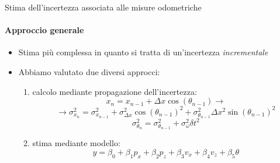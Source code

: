 \documentclass{beamer}
\begin{document}
\begin{frame}{Stima dell'incertezza associata alle misure odometriche}
\framesubtitle{Approccio generale}
\begin{itemize}
    \item Stima più complessa in quanto si tratta di un'incertezza \emph{incrementale}
    \item Abbiamo valutato due diversi approcci:
    \begin{enumerate}
        \item calcolo mediante propagazione dell'incertezza:
        \begin{equation}
            x_n =x_{n-1}+\Delta x  \cos{(\theta_{n-1})} \rightarrow
        \end{equation}
        \begin{equation}
        \rightarrow\sigma_{x_n}^2 = \sigma_{x_{n-1}}^2 + \sigma_{\Delta x}^2 \cos{(\theta_{n-1})}^2 + \sigma_{\theta_{n-1}}^2 \Delta x ^2 \sin{(\theta_{n-1})}^2
        \label{eq:prop}
\end{equation}
\begin{equation}
    \sigma_{\theta_{n}}^2 = \sigma_{\theta_{n-1}}^2 + \sigma_{\omega}^2 \delta t^2
    \label{eq:angleprop}
\end{equation}
        \item stima mediante modello:
\begin{equation}
    y = \beta_0 + \beta_{1}p_{x} + \beta_{2}p_{z} + \beta_{3}v_{x} + \beta_{4}v_{z} + \beta_{5}\theta
    \label{eq:model}
\end{equation}
\end{enumerate}
\end{itemize}
\end{frame}
\end{document}
